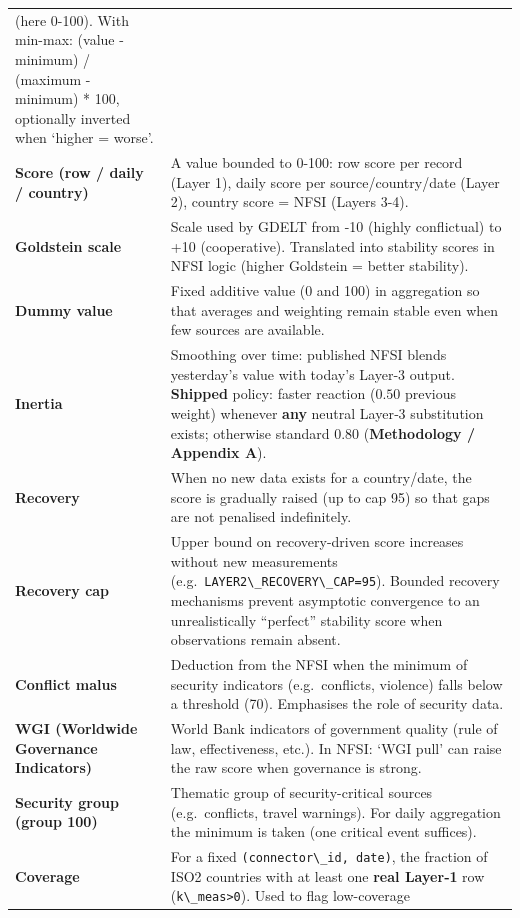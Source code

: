 \documentclass[
  11pt,
  peerreview,journal,onecolumn]{IEEEtran}
\newcommand{\passthrough}[1]{#1}
\begin{document}
\begin{longtable}[]{@{}
  >{\raggedright\arraybackslash}p{}
  >{\raggedright\arraybackslash}p{}@{}}
(here 0-100). With min-max: (value - minimum) / (maximum - minimum) *
100, optionally inverted when `higher = worse'. \\
\textbf{Score (row / daily / country)} & A value bounded to 0-100: row
score per record (Layer 1), daily score per source/country/date (Layer
2), country score = NFSI (Layers 3-4). \\
\textbf{Goldstein scale} & Scale used by GDELT from -10 (highly
conflictual) to +10 (cooperative). Translated into stability scores in
NFSI logic (higher Goldstein = better stability). \\
\textbf{Dummy value} & Fixed additive value (0 and 100) in aggregation
so that averages and weighting remain stable even when few sources are
available. \\
\textbf{Inertia} & Smoothing over time: published NFSI blends
yesterday's value with today's Layer‑3 output. \textbf{Shipped} policy:
faster reaction (\(0.50\) previous weight) whenever \textbf{any} neutral
Layer‑3 substitution exists; otherwise standard \textbf{\(0.80\)}
(\textbf{Methodology / Appendix A}). \\
\textbf{Recovery} & When no new data exists for a country/date, the
score is gradually raised (up to cap 95) so that gaps are not penalised
indefinitely. \\
\textbf{Recovery cap} & Upper bound on recovery-driven score increases
without new measurements
(e.g.~\passthrough{\lstinline!LAYER2\_RECOVERY\_CAP=95!}). Bounded
recovery mechanisms prevent asymptotic convergence to an unrealistically
``perfect'' stability score when observations remain absent. \\
\textbf{Conflict malus} & Deduction from the NFSI when the minimum of
security indicators (e.g.~conflicts, violence) falls below a threshold
(70). Emphasises the role of security data. \\
\textbf{WGI (Worldwide Governance Indicators)} & World Bank indicators
of government quality (rule of law, effectiveness, etc.). In NFSI: `WGI
pull' can raise the raw score when governance is strong. \\
\textbf{Security group (group 100)} & Thematic group of
security-critical sources (e.g.~conflicts, travel warnings). For daily
aggregation the minimum is taken (one critical event suffices). \\
\textbf{Coverage} & For a fixed
\passthrough{\lstinline!(connector\_id, date)!}, the fraction of ISO2
countries with at least one \textbf{real Layer‑1} row
(\passthrough{\lstinline!k\_meas>0!}). Used to flag low-coverage

\end{longtable}
\end{document}
